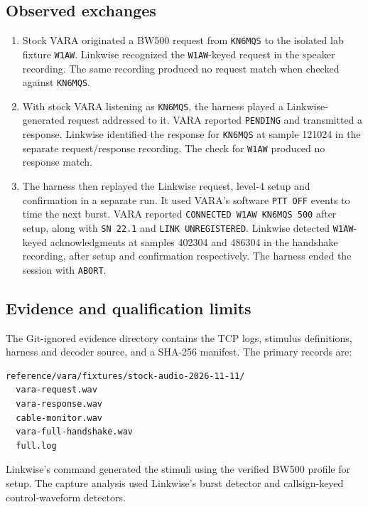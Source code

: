 \documentclass[11pt,a4paper]{article}
\newcommand{\pathtext}[1]{\path{#1}}
\begin{document}
\subsection{Observed exchanges}

\begin{enumerate}[leftmargin=*]
  \item Stock VARA originated a BW500 request from \texttt{KN6MQS} to the
        isolated lab fixture \texttt{W1AW}. Linkwise recognized the
        \texttt{W1AW}-keyed request in the speaker recording. The same
        recording produced no request match when checked against
        \texttt{KN6MQS}.
  \item With stock VARA listening as \texttt{KN6MQS}, the harness played a
        Linkwise-generated request addressed to it. VARA reported
        \texttt{PENDING} and transmitted a response. Linkwise identified the
        response for \texttt{KN6MQS} at sample 121024 in the separate
        request/response recording. The check for \texttt{W1AW} produced
        no response match.
  \item The harness then replayed the Linkwise request, level-4 setup and
        confirmation in a separate run. It used VARA's software
        \texttt{PTT OFF} events to time the next burst. VARA reported
        \texttt{CONNECTED W1AW KN6MQS 500} after setup, along with
        \texttt{SN 22.1} and \texttt{LINK UNREGISTERED}. Linkwise detected
        \texttt{W1AW}-keyed acknowledgments at samples 402304 and 486304 in
        the handshake recording, after setup and confirmation respectively.
        The harness ended the session with \texttt{ABORT}.
\end{enumerate}

\subsection{Evidence and qualification limits}

The Git-ignored evidence directory contains the TCP logs, stimulus
definitions, harness and decoder source, and a SHA-256 manifest.
The primary records are:

\begin{lstlisting}
reference/vara/fixtures/stock-audio-2026-11-11/
  vara-request.wav
  vara-response.wav
  cable-monitor.wav
  vara-full-handshake.wav
  full.log
\end{lstlisting}

Linkwise's
\pathtext{render-wav} command generated the stimuli using the verified BW500
profile for setup. The capture analysis used Linkwise's burst detector and
callsign-keyed control-waveform detectors.
\end{document}
